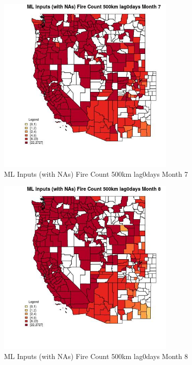 \begin{figure} 
\centering  
\includegraphics[width=0.77\textwidth]{Code_Outputs/Report_ML_input_PM25_Step4_part_f_de_duplicated_aves_prioritize_24hr_obswNAs_CountyFire_Count_500km_lag0daysmedianMonth7.jpg} 
\caption{\label{fig:Report_ML_input_PM25_Step4_part_f_de_duplicated_aves_prioritize_24hr_obswNAsCountyFire_Count_500km_lag0daysmedianMonth7}ML Inputs (with NAs) Fire Count 500km lag0days Month 7} 
\end{figure} 
 

\begin{figure} 
\centering  
\includegraphics[width=0.77\textwidth]{Code_Outputs/Report_ML_input_PM25_Step4_part_f_de_duplicated_aves_prioritize_24hr_obswNAs_CountyFire_Count_500km_lag0daysmedianMonth8.jpg} 
\caption{\label{fig:Report_ML_input_PM25_Step4_part_f_de_duplicated_aves_prioritize_24hr_obswNAsCountyFire_Count_500km_lag0daysmedianMonth8}ML Inputs (with NAs) Fire Count 500km lag0days Month 8} 
\end{figure} 
 

